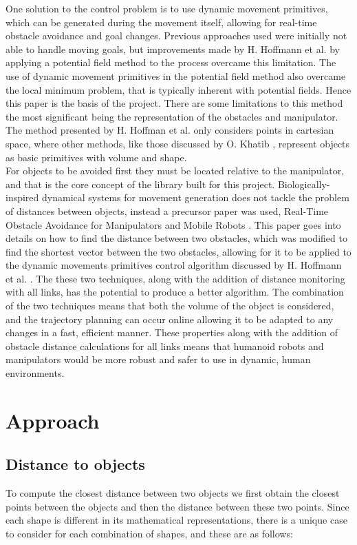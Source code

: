 \documentclass[a4paper, 10pt, conference]{ieeeconf}      %
\begin{document}
One solution to the control problem is to use dynamic movement primitives, which can be generated during the movement itself, allowing for real-time obstacle avoidance and goal changes. Previous approaches \cite{Janabi-Sharif} used were initially not able to handle moving goals, but improvements made by H. Hoffmann et al. \cite{Hoffmann} by applying a potential field method to the process overcame this limitation. The use of dynamic movement primitives in the potential field method also overcame the local minimum problem, that is typically inherent with potential fields. Hence this paper is the basis of the project. There are some limitations to this method the most significant being the representation of the obstacles and manipulator. The method presented by H. Hoffman et al.\cite{Hoffmann} only considers points in cartesian space, where other methods, like those discussed by O. Khatib \cite{Khatib}, represent objects as basic primitives with volume and shape. \\

For objects to be avoided first they must be located relative to the manipulator, and that is the core concept of the library built for this project. Biologically-inspired dynamical systems for movement generation \cite{Hoffmann} does not tackle the problem of distances between objects, instead a precursor paper was used, Real-Time Obstacle Avoidance for Manipulators and Mobile Robots \cite{Khatib}. This paper goes into details on how to find the distance between two obstacles, which was modified to find the shortest vector between the two obstacles, allowing for it to be applied to the dynamic movements primitives control algorithm discussed by H. Hoffmann et al. \cite{Hoffmann}. The these two techniques, along with the addition of distance monitoring with all links, has the potential to produce a better algorithm. The combination of the two techniques means that both the volume of the object is considered, and the trajectory planning can occur online allowing it to be adapted to any changes in a fast, efficient manner. These properties along with the addition of obstacle distance calculations for all links means that humanoid robots and manipulators would be more robust and safer to use in dynamic, human environments.

\section{Approach}

\subsection{Distance to objects} %
To compute the closest distance between two objects we first obtain the closest points between the objects and then the distance between these two points. Since each shape is different in its mathematical representations, there is a unique case to consider for each combination of shapes, and these are as follows:
\end{document}
